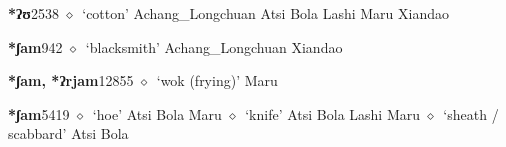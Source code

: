   \begin{list}{}{\leftmargin=1.5em \itemindent=-1.5em}
  \item {\footnotesize \textbf{*ʔʊ}}{\tiny 2538}
         $\diamond$~`cotton'
         Achang\_Longchuan 
\hspace{1ex}
         Atsi 
\hspace{1ex}
         Bola 
\hspace{1ex}
         Lashi 
\hspace{1ex}
         Maru 
\hspace{1ex}
         Xiandao 
  \item {\footnotesize \textbf{*ʃam}}{\tiny 942}
\hspace{1ex}
         $\diamond$~`blacksmith'
         Achang\_Longchuan 
\hspace{1ex}
         Xiandao 
  \item {\footnotesize \textbf{*ʃam, *ʔrjam}}{\tiny 12855}
\hspace{1ex}
         $\diamond$~`wok (frying)'
         Maru 
  \item {\footnotesize \textbf{*ʃam}}{\tiny 5419}
\hspace{1ex}
         $\diamond$~`hoe'
         Atsi 
\hspace{1ex}
         Bola 
\hspace{1ex}
         Maru 
\hspace{1ex}
         $\diamond$~`knife'
         Atsi 
\hspace{1ex}
         Bola 
\hspace{1ex}
         Lashi 
\hspace{1ex}
         Maru 
\hspace{1ex}
         $\diamond$~`sheath / scabbard'
         Atsi 
\hspace{1ex}
         Bola 

\end{list}
